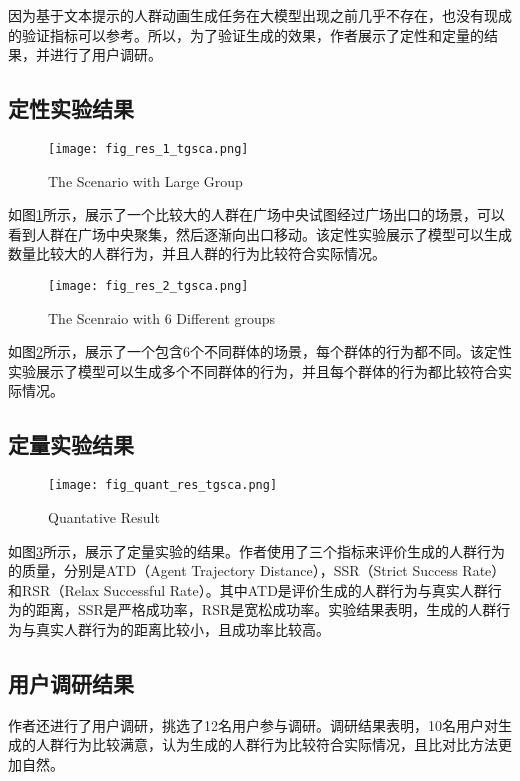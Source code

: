 因为基于文本提示的人群动画生成任务在大模型出现之前几乎不存在，也没有现成的验证指标可以参考。所以，为了验证生成的效果，作者展示了定性和定量的结果，并进行了用户调研。

\subsection{定性实验结果}

\begin{figure}
    \texttt{[image: fig\_res\_1\_tgsca.png]}
    \caption{The Scenario with Large Group}
    \label{fig:res_1}
\end{figure}

如图\ref{fig:res_1}所示，展示了一个比较大的人群在广场中央试图经过广场出口的场景，可以看到人群在广场中央聚集，然后逐渐向出口移动。该定性实验展示了模型可以生成数量比较大的人群行为，并且人群的行为比较符合实际情况。

\begin{figure}
    \texttt{[image: fig\_res\_2\_tgsca.png]}
    \caption{The Scenraio with 6 Different groups}
    \label{fig:res_2}
\end{figure}

如图\ref{fig:res_2}所示，展示了一个包含6个不同群体的场景，每个群体的行为都不同。该定性实验展示了模型可以生成多个不同群体的行为，并且每个群体的行为都比较符合实际情况。

\subsection{定量实验结果}

\begin{figure}
    \texttt{[image: fig\_quant\_res\_tgsca.png]}
    \caption{Quantative Result}
    \label{fig:quant_res}
\end{figure}

如图\ref{fig:quant_res}所示，展示了定量实验的结果。作者使用了三个指标来评价生成的人群行为的质量，分别是ATD（Agent Trajectory Distance），SSR（Strict Success Rate）和RSR（Relax Successful Rate）。其中ATD是评价生成的人群行为与真实人群行为的距离，SSR是严格成功率，RSR是宽松成功率。实验结果表明，生成的人群行为与真实人群行为的距离比较小，且成功率比较高。

\subsection{用户调研结果}

作者还进行了用户调研，挑选了12名用户参与调研。调研结果表明，10名用户对生成的人群行为比较满意，认为生成的人群行为比较符合实际情况，且比对比方法更加自然。